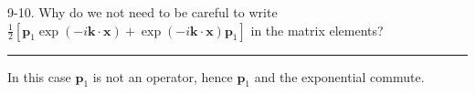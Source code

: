 \documentclass[12pt]{article}
\begin{document}
9-10.
Why do we not need to be careful to write
$
\frac{1}{2}
\left[
\mathbf p_1\exp(-i\mathbf k\cdot\mathbf x)
+\exp(-i\mathbf k\cdot\mathbf x)\mathbf p_1
\right]
$
in the matrix elements?

\bigskip
\hrule

\bigskip
In this case $\mathbf p_1$ is not an operator,
hence $\mathbf p_1$ and the exponential commute.
\end{document}
